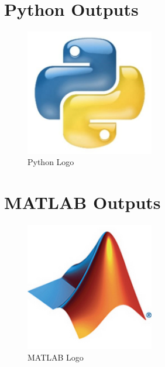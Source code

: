 \documentclass{article}
\begin{document}
\section{Python Outputs}
\begin{figure}[h]
    \centering
    \includegraphics[width=0.5\textwidth]{misc_media/Python-Logo.jpg}
    \caption{Python Logo}  %
    \label{fig:python-logo} %
\end{figure}

\vspace{2cm}  %






\section{MATLAB Outputs}
\begin{figure}[h]
    \centering
    \includegraphics[width=0.5\textwidth]{misc_media/Matlab-Logo.jpg}
    \caption{MATLAB Logo}  %
    \label{fig:matlab-logo} %
\end{figure}
\end{document}
